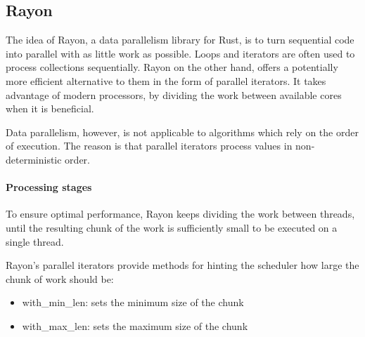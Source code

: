 
\subsection{Rayon}
The idea of Rayon, a data parallelism library for Rust, is to turn sequential code into parallel with as little work as possible. Loops and iterators are often used to process collections sequentially. Rayon on the other hand, offers a potentially more efficient alternative to them in the form of parallel iterators. It takes advantage of modern processors, by dividing the work between available cores when it is beneficial. 

Data parallelism, however, is not applicable to algorithms which rely on the order of execution. The reason is that parallel iterators process values in non-deterministic order. 


\paragraph*{Processing stages}



To ensure optimal performance, Rayon keeps dividing the work between threads, until the resulting chunk of the work is sufficiently small to be executed on a single thread. 

Rayon's parallel iterators provide methods for hinting the scheduler how large the chunk of work should be: 
\begin{itemize}
    \item with\_min\_len: sets the minimum size of the chunk
    \item with\_max\_len: sets the maximum size of the chunk
\end{itemize}



